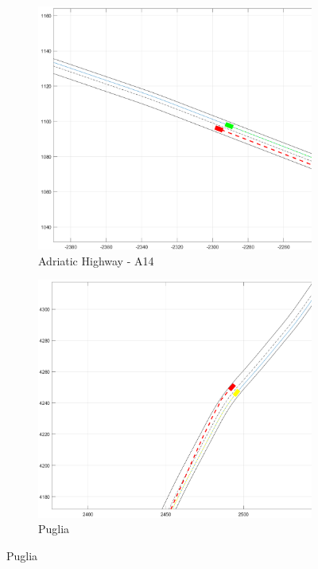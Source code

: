 \begin{figure}[H]
\centering

    \begin{subfigure}{.5\textwidth}
    \centering
    \includegraphics[width=\textwidth,keepaspectratio]{Figures/A_14_green_2.png}
    \caption{Adriatic Highway - A14}
    \label{subfig:a14_mil}
    \end{subfigure}%
    
    \vspace{2mm}
    
    \begin{subfigure}{.5\textwidth}
    \centering
    \includegraphics[width=\textwidth,keepaspectratio]{Figures/Puglia_yellow_1.png}
    \caption{Puglia}
    \label{subfig:puglia_mil}
    \end{subfigure}%
    

\end{figure}
